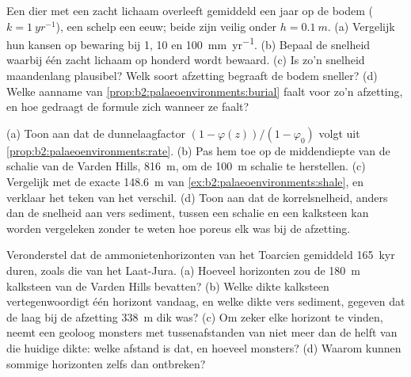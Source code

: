 \begin{exercise}[$\star\star\star$]\label{exo:b2:palaeoenvironments:10}
Een dier met een zacht lichaam overleeft gemiddeld een jaar op de bodem ($k = \qty{1}{yr^{-1}}$), een
schelp een eeuw; beide zijn veilig onder $h = \qty{0.1}{m}$. (a) Vergelijk hun kansen op
bewaring bij 1, 10 en \qty{100}{mm.yr^{-1}}. (b) Bepaal de snelheid waarbij één zacht lichaam op
honderd wordt bewaard. (c) Is zo'n snelheid maandenlang plausibel? Welk soort afzetting begraaft
de bodem sneller? (d) Welke aanname van \cref{prop:b2:palaeoenvironments:burial} faalt voor zo'n
afzetting, en hoe gedraagt de formule zich wanneer ze faalt?
\end{exercise}

\begin{exercise}[$\star\star\star$]\label{exo:b2:palaeoenvironments:11}
(a) Toon aan dat de dunnelaagfactor $(1 - \varphi(z))/(1 - \varphi_0)$ volgt uit
\cref{prop:b2:palaeoenvironments:rate}. (b) Pas hem toe op de middendiepte van de schalie van de Varden Hills,
\qty{816}{m}, om de \qty{100}{m} schalie te herstellen. (c) Vergelijk met de exacte \qty{148.6}{m} van
\cref{ex:b2:palaeoenvironments:shale}, en verklaar het teken van het verschil. (d) Toon aan dat de
korrelsnelheid, anders dan de snelheid aan vers sediment, tussen een schalie en een kalksteen kan worden vergeleken
zonder te weten hoe poreus elk was bij de afzetting.
\end{exercise}

\begin{exercise}[$\star\star\star$]\label{exo:b2:palaeoenvironments:12}
Veronderstel dat de ammonietenhorizonten van het Toarcien gemiddeld \qty{165}{kyr} duren, zoals die van het Laat-Jura.
(a) Hoeveel horizonten zou de \qty{180}{m} kalksteen van de Varden Hills bevatten? (b) Welke dikte
kalksteen vertegenwoordigt één horizont vandaag, en welke dikte vers sediment, gegeven dat de
laag bij de afzetting \qty{338}{m} dik was? (c) Om zeker elke horizont te vinden, neemt een
geoloog monsters met tussenafstanden van niet meer dan de helft van die huidige dikte: welke afstand is dat, en hoeveel
monsters? (d) Waarom kunnen sommige horizonten zelfs dan ontbreken?
\end{exercise}

